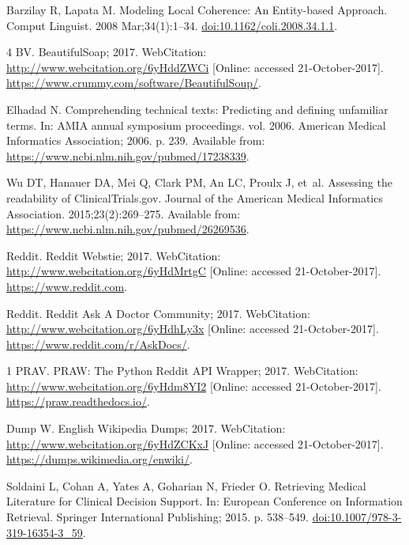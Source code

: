 \documentclass[10pt,a4paper]{article}
\begin{document}
\begin{thebibliography}{10}
	Barzilay R, Lapata M.
	\newblock Modeling Local Coherence: An Entity-based Approach.
	\newblock Comput Linguist. 2008 Mar;34(1):1--34.
	\newblock \href {http://dx.doi.org/10.1162/coli.2008.34.1.1}
	{doi:10.1162/coli.2008.34.1.1}.
	
	4 BV. BeautifulSoap; 2017.
	\newblock WebCitation: \url{http://www.webcitation.org/6yHddZWCi} [Online:
	accessed 21-October-2017].
	\newblock \url{https://www.crummy.com/software/BeautifulSoup/}.
	
	Elhadad N.
	\newblock Comprehending technical texts: Predicting and defining unfamiliar
	terms.
	\newblock In: AMIA annual symposium proceedings. vol. 2006. American Medical
	Informatics Association; 2006. p. 239.
	\newblock Available from: \url{https://www.ncbi.nlm.nih.gov/pubmed/17238339}.
	
	Wu DT, Hanauer DA, Mei Q, Clark PM, An LC, Proulx J, et~al.
	\newblock Assessing the readability of ClinicalTrials.gov.
	\newblock Journal of the American Medical Informatics Association.
	2015;23(2):269--275.
	\newblock Available from: \url{https://www.ncbi.nlm.nih.gov/pubmed/26269536}.
	
	Reddit. Reddit Webstie; 2017.
	\newblock WebCitation: \url{http://www.webcitation.org/6yHdMrtgC} [Online:
	accessed 21-October-2017].
	\newblock \url{https://www.reddit.com}.
	
	Reddit. Reddit Ask A Doctor Community; 2017.
	\newblock WebCitation: \url{http://www.webcitation.org/6yHdhLy3x} [Online:
	accessed 21-October-2017].
	\newblock \url{https://www.reddit.com/r/AskDocs/}.
	
	1 PRAV. PRAW: The Python Reddit API Wrapper; 2017.
	\newblock WebCitation: \url{http://www.webcitation.org/6yHdm8YI2} [Online:
	accessed 21-October-2017].
	\newblock \url{https://praw.readthedocs.io/}.
	
	Dump W. English Wikipedia Dumps; 2017.
	\newblock WebCitation: \url{http://www.webcitation.org/6yHdZCKxJ} [Online:
	accessed 21-October-2017].
	\newblock \url{https://dumps.wikimedia.org/enwiki/}.
	
	Soldaini L, Cohan A, Yates A, Goharian N, Frieder O.
	\newblock Retrieving Medical Literature for Clinical Decision Support.
	\newblock In: European Conference on Information Retrieval. Springer
	International Publishing; 2015. p. 538--549.
	\newblock \href {http://dx.doi.org/10.1007/978-3-319-16354-3\_59}
	{doi:10.1007/978-3-319-16354-3\_59}.
	

\end{thebibliography}
\end{document}
